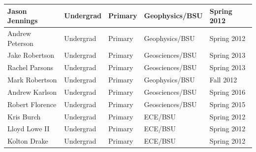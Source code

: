 \documentclass[11pt]{article}
\begin{document}
\begin{table}[!htbp]
\begin{tabular}{|l|l|l|l|l|}
Jason Jennings & Undergrad & Primary & Geophysics/BSU & Spring 2012 \\ \hline
Andrew Peterson & Undergrad & Primary & Geophysics/BSU & Spring 2012 \\ \hline
Jake Robertson & Undergrad & Primary & Geosciences/BSU & Spring 2013 \\ \hline
Rachel Parsons & Undergrad & Primary & Geosciences/BSU & Spring 2013 \\ \hline
Mark Robertson & Undergrad & Primary & Geophysics/BSU & Fall 2012 \\ \hline
Andrew Karlson & Undergrad & Primary & Geosciences/BSU & Spring 2016 \\ \hline
Robert Florence & Undergrad & Primary & Geosciences/BSU & Spring 2015 \\ \hline
Kris Burch & Undergrad & Primary & ECE/BSU & Spring 2012 \\ \hline
Lloyd Lowe II & Undergrad & Primary & ECE/BSU & Spring 2012 \\ \hline
Kolton Drake & Undergrad & Primary & ECE/BSU & Spring 2012 \\ \hline
\end{tabular}
\end{table}
\end{document}
